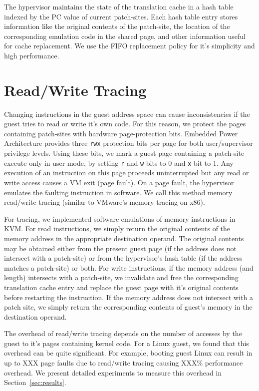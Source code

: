 \documentclass[10pt,twocolumn]{article}
\begin{document}
The hypervisor maintains the state of the translation cache in
a hash table indexed by the PC value of current patch-sites. Each hash table
entry stores information like the original contents of the patch-site,
the location of the corresponding emulation code in the shared page, and other
information useful
for cache replacement. We use the FIFO replacement policy for it's simplicity
and high performance.
\section{Read/Write Tracing}
\label{sec:tracing}
Changing instructions in the guest address space can cause
inconsistencies if the guest tries to read or write it's own code.
For this reason, we protect the pages containing patch-sites with hardware
page-protection bits. Embedded Power Architecture provides three {\tt rwx}
protection bits per page for both user/supervisor privilege levels. Using these
bits, we mark a guest page containing a patch-site
execute only in user mode, by setting {\tt r} and {\tt w} bits to 0 and {\tt x} bit to 1.
Any execution of an instruction on this page proceeds uninterrupted
but any read or write access causes a VM exit (page fault).
On a page fault, the hypervisor
emulates the faulting instruction in software. We call this
method memory read/write tracing (similar to VMware's memory tracing
on x86\cite{agesen:comparison}).

For tracing, we implemented software emulations of memory instructions in KVM.
For read instructions, we simply return the original contents of the memory
address in the appropriate destination
operand. The original contents may be obtained either from the present guest
page (if the address does not intersect with a patch-site) or from the hypervisor's
hash table (if the address matches a patch-site) or both.
For write instructions, if the memory address (and length) intersects with a patch-site,
we invalidate and free the corresponding translation cache
entry and replace the guest page with it's original contents before
restarting the instruction. If the memory address does not intersect with a patch
site, we simply return the corresponding contents of guest's memory in the destination
operand.

The overhead of read/write tracing depends on the number of accesses by the guest
to it's pages containing kernel code. For a Linux guest, we found that this overhead
can be quite significant. For example, booting guest Linux can result in
up to XXX page faults due to read/write tracing causing XXX\% performance overhead.
We present detailed experiments to measure this overhead in Section~\ref{sec:results}.
\end{document}
